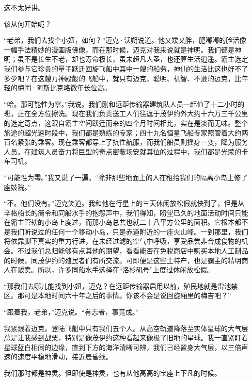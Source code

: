 \documentclass[AutoFakeBold=true]{book}
\begin{document}
这不太好讲。

该从何开始呢？

\vspace*{1em}

``老弟，我们去找个小妞，如何？''迈克·沃朔说道。他又矮又胖，肥嘟嘟的脸活像一幅手法精妙的漫画版佛像，而在那时候，迈克对我来说就是神明。我们都是神明；虽不是长生不老，却也寿命极长，虽未超凡人圣，也还算生活逍遥。霸主选定我们参与它珍贵的量子跃迁回旋飞船中其中一艘的船务，神仙的生活比这也好不了多少吧？在这艘万神殿般的飞船中，就只有迈克，聪明、机智、不逊的迈克，比年轻的梅闰·阿斯比克略微年长位高。

``哈。那可能性为零。''我说。我们刚和远距传输器建筑队人员一起值了十二小时的班，正在全方位擦洗。现在我们负责送工人们往返于茂伊约外大约十六万三千公里的选定奇点，这跟自霸主空间跃迁而来的四个月时间相比，实在是淡而无味。整个旅途的超光速时段中，我们都是熟练的专家；四十九名恒星飞船专家照管着大约两百名紧张的乘客。现在乘客都穿上了抗性航服，而我们船员则摇身一变，降为服务人员。在建筑人员奋力将巨型的奇点密蔽场安就其位的过程中，我们都是光荣的卡车司机。

``可能性为零。''我又说了一遍。``除非那些地面上的人在租给我们的隔离小岛上修了座妓院。''

``不。他们没有。''迈克笑道。我和他在行星上的三天休闲放松假就快到了，但是从辛格船长的简令和同船水手的抱怨声中，我们得知，盼望已久的地面活动时间只能在霸主管辖的小岛上度过，而那小岛总共也就二十八平方公里的面积。它根本都不是我们听说过的任何一个移动小岛，只是赤道附近的一座火山峰。一到那里，我们将依靠脚下真实的重力行进，在未经过滤的空气中呼吸，享受品尝非合成食物的机会。不过我们总归能够有点其他的期望，看看能否在免税商店中购买本地人工制品的时候，同茂伊约的殖民者们有所交流。可即便是这些土特产，也是霸主的精明商人在贩卖。所以，许多同船水手选择在``洛杉矶号''上度过休闲放松假。

``那我们去哪儿能找到小妞，迈克？在远距传输器启用以前，殖民地就是雷池禁区。那可是本地时间六十年之后的事情。你该不会是说回旋厢里的梅吉吧？''

``跟着我，老弟，''迈克说。``有志者，事竟成。''

我紧跟着迈克。登陆飞船中只有我们五个人。从高空轨道降落至实体星球的大气层总是让我感到战栗，特别是像茂伊约这种看起来像极了旧地的星球。我一直紧盯着星球蓝白相间的边缘，直到下方的海洋清晰可辨，我们已经置身大气层，以三倍声速的速度平稳地滑动，接近晨昏线。

我们那时都是神灵。但即使是神灵，也有从他高高的宝座上下凡的时候。

\vspace*{1em}
\end{document}

